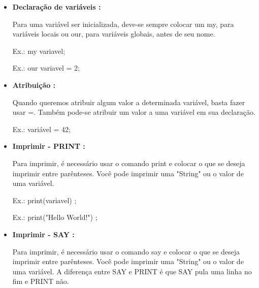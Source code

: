 \documentclass[a4paper]{article}
\begin{document}
{{{{{\begin{itemize}
        \item \textbf{Declaração de variáveis :}
        
            Para uma variável ser inicializada, deve-se
            sempre colocar um 
            \textcolor{NavyBlue}{my},
            para variáveis locais ou 
            \textcolor{NavyBlue}{our},
            para variáveis globais,
            antes de seu nome.
            
            \textcolor{NavyBlue}{Ex.:}
            \textcolor{NavyBlue}{my} 
            variavel;
        
            \textcolor{NavyBlue}{Ex.:} 
            \textcolor{NavyBlue}{our} variavel = 2;  
        
        \bigskip
        
        \item \textbf{Atribuição :}
        
            Quando queremos atribuir algum valor a
            determinada variável, basta fazer usar 
            \textcolor{NavyBlue}{=}.
            Também pode-se atribuir um valor a uma
            variável em sua declaração.
            
            \textcolor{NavyBlue}{Ex.:}
            variável 
            \textcolor{NavyBlue}{=}
            42;
            
        \bigskip
        
        \item \textbf{Imprimir - PRINT : }
        
            Para imprimir, é necessário usar o
            comando 
            \textcolor{NavyBlue}{print} e
            colocar o que se deseja imprimir entre
            parênteses.
            Você pode imprimir uma "String" ou o 
            valor de uma variável.
            
            \textcolor{NavyBlue}{Ex.:}
            \textcolor{NavyBlue}{print(variavel)}
            ;
            
            \textcolor{NavyBlue}{Ex.:}
            \textcolor{NavyBlue}{print("Hello World!")}
            ;
       
       \bigskip
            
       \item \textbf{Imprimir - SAY : }
        
            Para imprimir, é necessário usar o
            comando 
            \textcolor{NavyBlue}{say} e
            colocar o que se deseja imprimir entre
            parênteses.
            Você pode imprimir uma "String" ou o 
            valor de uma variável.
            A diferença entre SAY e PRINT é que
            SAY pula uma linha no fim e PRINT não.
            

\end{itemize}}}}}}
\end{document}

